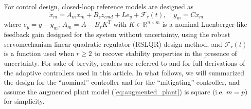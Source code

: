 \documentclass[english]{ifacconf}
\begin{document}
For control design, closed-loop reference models are designed as
\begin{equation}
\dot{x}_m = A_m x_m + B_z z_{cmd} + L e_y + \mathcal{F}_r(t), \quad y_m = C x_m
\end{equation}
where $e_y = y - y_m$, $A_m = A - B_r K^T$ with $K\in\mathbb{R}^{n\times m}$ is a nominal Luenberger-like feedback gain designed for the system without uncertainty, using the robust servomechanism linear quadratic regulator (RSLQR) design method, and $\mathcal{F}_r(t)$ is a function used when $r \geq 2$ to recover stability properties in the presence of uncertainty. For sake of brevity, readers are referred to \cite{qu2016phd} and \cite{qu2016adaptive} for full derivations of the adaptive controllers used in this article. In what follows, we will summarized the design for the ``nominal'' controller and for the ``mitigating'' controller, and assume the augmented plant model (\ref{eq:augmented_plant}) is square (i.e. $m = p$) for simplicity.
 
\end{document}

